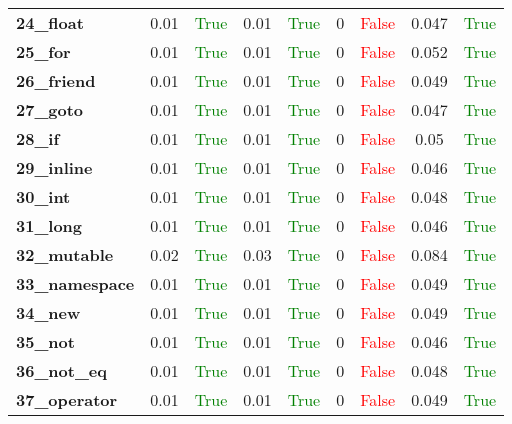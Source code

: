 \documentclass{article}
\begin{document}
\begin{xltabular}{\textwidth}{lcccccccc}
\textbf{24\_float}& 0.01&\textcolor{green}{True}& 0.01&\textcolor{green}{True}& 0&\textcolor{red}{False}& 0.047&\textcolor{green}{True} \\[0.5ex]
\textbf{25\_for}& 0.01&\textcolor{green}{True}& 0.01&\textcolor{green}{True}& 0&\textcolor{red}{False}& 0.052&\textcolor{green}{True} \\[0.5ex]
\textbf{26\_friend}& 0.01&\textcolor{green}{True}& 0.01&\textcolor{green}{True}& 0&\textcolor{red}{False}& 0.049&\textcolor{green}{True} \\[0.5ex]
\textbf{27\_goto}& 0.01&\textcolor{green}{True}& 0.01&\textcolor{green}{True}& 0&\textcolor{red}{False}& 0.047&\textcolor{green}{True} \\[0.5ex]
\textbf{28\_if}& 0.01&\textcolor{green}{True}& 0.01&\textcolor{green}{True}& 0&\textcolor{red}{False}& 0.05&\textcolor{green}{True} \\[0.5ex]
\textbf{29\_inline}& 0.01&\textcolor{green}{True}& 0.01&\textcolor{green}{True}& 0&\textcolor{red}{False}& 0.046&\textcolor{green}{True} \\[0.5ex]
\textbf{30\_int}& 0.01&\textcolor{green}{True}& 0.01&\textcolor{green}{True}& 0&\textcolor{red}{False}& 0.048&\textcolor{green}{True} \\[0.5ex]
\textbf{31\_long}& 0.01&\textcolor{green}{True}& 0.01&\textcolor{green}{True}& 0&\textcolor{red}{False}& 0.046&\textcolor{green}{True} \\[0.5ex]
\textbf{32\_mutable}& 0.02&\textcolor{green}{True}& 0.03&\textcolor{green}{True}& 0&\textcolor{red}{False}& 0.084&\textcolor{green}{True} \\[0.5ex]
\textbf{33\_namespace}& 0.01&\textcolor{green}{True}& 0.01&\textcolor{green}{True}& 0&\textcolor{red}{False}& 0.049&\textcolor{green}{True} \\[0.5ex]
\textbf{34\_new}& 0.01&\textcolor{green}{True}& 0.01&\textcolor{green}{True}& 0&\textcolor{red}{False}& 0.049&\textcolor{green}{True} \\[0.5ex]
\textbf{35\_not}& 0.01&\textcolor{green}{True}& 0.01&\textcolor{green}{True}& 0&\textcolor{red}{False}& 0.046&\textcolor{green}{True} \\[0.5ex]
\textbf{36\_not\_eq}& 0.01&\textcolor{green}{True}& 0.01&\textcolor{green}{True}& 0&\textcolor{red}{False}& 0.048&\textcolor{green}{True} \\[0.5ex]
\textbf{37\_operator}& 0.01&\textcolor{green}{True}& 0.01&\textcolor{green}{True}& 0&\textcolor{red}{False}& 0.049&\textcolor{green}{True} \\[0.5ex]

\end{xltabular}
\end{document}
